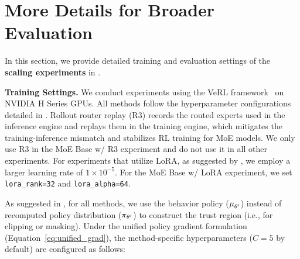\section{More Details for Broader Evaluation}
\label{appendix:detailed_experimental_settings}

In this section, we provide detailed training and evaluation settings of the \textbf{scaling experiments} in . 

\textbf{Training Settings.}
We conduct experiments using the VeRL framework~\citep{sheng2024hybridflow} on NVIDIA H Series GPUs. All methods follow the hyperparameter configurations detailed in . 
Rollout router replay (R3) \citep{ma2025stabilizing} records the routed experts used in the inference engine and replays them in the training engine, which mitigates the training-inference mismatch and stabilizes RL training for MoE models. We only use R3 in the MoE Base w/ R3 experiment and do not use it in all other experiments.
For experiments that utilize LoRA, as suggested by \citet{schulman2025lora}, we employ a larger learning rate of $1\times 10^{-5}$. For the MoE Base w/ LoRA experiment, we set \texttt{lora\_rank=32} and \texttt{lora\_alpha=64}.

As suggested in , for all methods, we use the behavior policy ($\operatorname*{{\textcolor{black}{\mu}}}_{\theta'}$) instead of recomputed policy distribution ($\operatorname*{{\textcolor{black}{\pi}}}_{\theta'}$) to construct the trust region (i.e., for clipping or masking). Under the unified policy gradient formulation (Equation~\ref{eq:unified_grad}), the method-specific hyperparameters ($C=5$ by default) are configured as follows:

